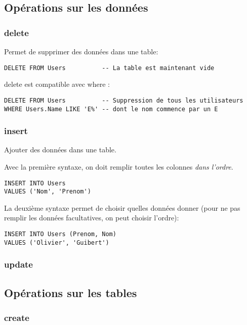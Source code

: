 \documentclass[10pt,a4paper,french]{article}
\begin{document}
\subsection{Opérations sur les données}

\subsubsection{\gls{delete}}

Permet de supprimer des données dans une table:
\begin{verbatim}
DELETE FROM Users          -- La table est maintenant vide
\end{verbatim}

\gls{delete} est compatible avec \gls{where} :
\begin{verbatim}
DELETE FROM Users          -- Suppression de tous les utilisateurs
WHERE Users.Name LIKE 'E%' -- dont le nom commence par un E
\end{verbatim}

\subsubsection{\gls{insert}}\label{insert}

Ajouter des données dans une table.

Avec la première syntaxe, on doit remplir toutes les colonnes \textit{dans l'ordre}.
\begin{verbatim}
INSERT INTO Users
VALUES ('Nom', 'Prenom')
\end{verbatim}

La deuxième syntaxe permet de choisir quelles données donner (pour ne pas remplir les données facultatives, on peut choisir l'ordre):
\begin{verbatim}
INSERT INTO Users (Prenom, Nom)
VALUES ('Olivier', 'Guibert')
\end{verbatim}

\subsubsection{\gls{update}}\label{update}

\subsection{Opérations sur les tables}

\subsubsection{\gls{create}}
\end{document}
